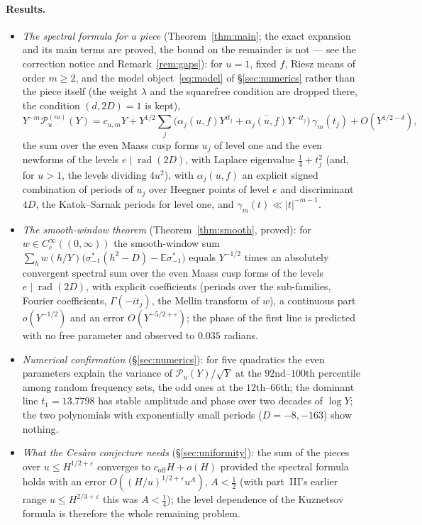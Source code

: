 \documentclass[11pt,a4paper]{article}
\theoremstyle{remark}\newtheorem{remark}[theorem]{Remark}
\begin{document}
\paragraph{Results.}
\begin{itemize}
\item \emph{The spectral formula for a piece} (Theorem~\ref{thm:main}; the exact expansion and its main terms are
proved, the bound on the remainder is not --- see the correction notice and Remark~\ref{rem:gaps}): for $u=1$, fixed $f$,
Riesz means of order $m\ge2$, and the model object~\eqref{eq:model}
of \S\ref{sec:numerics} rather than the piece itself (the weight $\lambda$ and the squarefree condition are dropped
there, the condition $(d,2D)=1$ is kept),
\[
Y^{-m}\mathcal P^{(m)}_u(Y)=c_{u,m}Y+Y^{1/2}\sum_{j}\bigl(\alpha_j(u,f)Y^{it_j}+\overline{\alpha_j(u,f)}Y^{-it_j}\bigr)\,\gamma_m(t_j)+O(Y^{1/2-\delta}),
\]
the sum over the even Maass cusp forms $u_j$ of level one and the even newforms of the levels $e\mid\operatorname{rad}(2D)$,
with Laplace eigenvalue $\tfrac14+t_j^2$ (and, for $u>1$, the levels dividing $4u^2$), with $\alpha_j(u,f)$ an explicit
signed combination of periods of $u_j$ over Heegner points of level $e$ and discriminant $4D$, the Katok--Sarnak
periods for level one, and $\gamma_m(t)\ll|t|^{-m-1}$.
\item \emph{The smooth-window theorem} (Theorem~\ref{thm:smooth}, proved): for $w\in C_c^\infty((0,\infty))$ the
smooth-window sum $\sum_hw(h/Y)\bigl(\sigma^*_{-1}(h^2-D)-\mathbb E\sigma^*_{-1}\bigr)$ equals $Y^{-1/2}$ times an absolutely convergent
spectral sum over the even Maass cusp forms of the levels $e\mid\operatorname{rad}(2D)$, with explicit coefficients
(periods over the sub-families, Fourier coefficients, $\Gamma(-it_j)$, the Mellin transform of $w$), a continuous
part $o(Y^{-1/2})$ and an error $O(Y^{-5/2+\varepsilon})$; the phase of the first line is predicted with no free parameter
and observed to $0.035$ radians.
\item \emph{Numerical confirmation} (\S\ref{sec:numerics}): for five quadratics the even parameters explain the
variance of $\mathcal P_u(Y)/\sqrt Y$ at the $92$nd--$100$th percentile among random frequency sets, the odd ones at the
$12$th--$66$th; the dominant line $t_1=13.7798$ has stable amplitude and phase over two decades of $\log Y$; the two
polynomials with exponentially small periods ($D=-8,-163$) show nothing.
\item \emph{What the Ces\`aro conjecture needs} (\S\ref{sec:uniformity}): the sum of the pieces over $u\le H^{1/2+\varepsilon}$
converges to $c_{\mathrm{off}}H+o(H)$ provided the spectral formula holds with an error $O((H/u)^{1/2+\varepsilon}u^{A})$,
$A<\tfrac12$ (with part~III's earlier range $u\le H^{2/3+\varepsilon}$ this was $A<\tfrac14$); the level dependence of the Kuznetsov formula is therefore the whole remaining problem.
\end{itemize}
\end{document}
